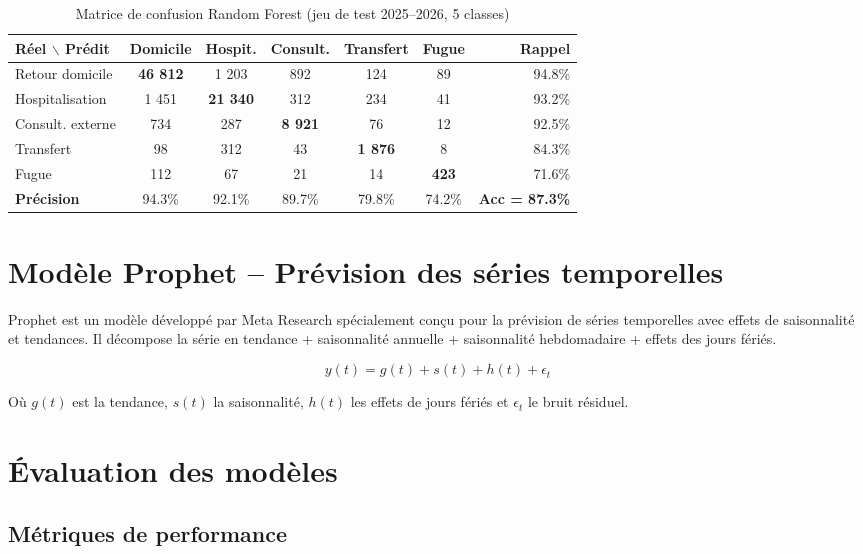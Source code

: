 \documentclass[12pt,a4paper]{report}
\begin{document}
	\begin{table}[H]
		\centering
		\caption{Matrice de confusion Random Forest (jeu de test 2025--2026, 5 classes)}
		\renewcommand{\arraystretch}{1.3}
		\begin{tabular}{l|ccccc|r}
			\toprule
			\textbf{Réel $\backslash$ Prédit} & \textbf{Domicile} & \textbf{Hospit.} & \textbf{Consult.} & \textbf{Transfert} & \textbf{Fugue} & \textbf{Rappel} \\
			\midrule
			Retour domicile  & \textbf{46 812} & 1 203 & 892  & 124  & 89  & 94.8\% \\
			Hospitalisation  & 1 451 & \textbf{21 340} & 312  & 234  & 41  & 93.2\% \\
			Consult. externe & 734   & 287   & \textbf{8 921} & 76  & 12  & 92.5\% \\
			Transfert        & 98    & 312   & 43   & \textbf{1 876} & 8  & 84.3\% \\
			Fugue            & 112   & 67    & 21   & 14  & \textbf{423}  & 71.6\% \\
			\midrule
			\textbf{Précision} & 94.3\% & 92.1\% & 89.7\% & 79.8\% & 74.2\% & \textbf{Acc = 87.3\%} \\
			\bottomrule
		\end{tabular}
	\end{table}
	
	\section{Modèle Prophet -- Prévision des séries temporelles}
	
	Prophet est un modèle développé par Meta Research spécialement conçu pour la prévision
	de séries temporelles avec effets de saisonnalité et tendances. Il décompose la série
	en tendance + saisonnalité annuelle + saisonnalité hebdomadaire + effets des jours fériés.
	
	$$y(t) = g(t) + s(t) + h(t) + \epsilon_t$$
	
	Où $g(t)$ est la tendance, $s(t)$ la saisonnalité, $h(t)$ les effets de jours fériés
	et $\epsilon_t$ le bruit résiduel.
	\newpage
	\section{Évaluation des modèles}
	
	\subsection{Métriques de performance}
	
\end{document}

